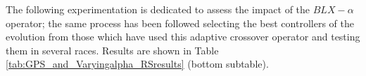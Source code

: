 \documentclass[10pt,journal,compsoc]{IEEEtran}
\begin{document}

The following experimentation is dedicated to assess the impact of the
$BLX-\alpha$ operator; the same process has been followed
selecting the best controllers of the evolution from those which
have used this adaptive crossover operator and testing them in several
races. Results are shown in Table \ref{tab:GPS_and_Varyingalpha_RSresults} (bottom subtable). 
%
%
%
%
%				
%				
\end{document}
